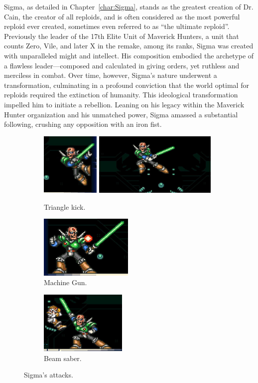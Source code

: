 Sigma, as detailed in Chapter~\ref{char:Sigma}, stands as the greatest creation of Dr. Cain, the creator of all reploids, and is often considered as the most powerful reploid ever created, sometimes even referred to as ``the ultimate reploid''. Previously the leader of the 17th Elite Unit of Maverick Hunters, a unit that counts Zero, Vile, and later X in the remake, among its ranks, Sigma was created with unparalleled might and intellect. His composition embodied the archetype of a flawless leader—composed and calculated in giving orders, yet ruthless and merciless in combat. Over time, however, Sigma's nature underwent a transformation, culminating in a profound conviction that the world optimal for reploids required the extinction of humanity. This ideological transformation impelled him to initiate a rebellion. Leaning on his legacy within the Maverick Hunter organization and his unmatched power, Sigma amassed a substantial following, crushing any opposition with an iron fist.
\begin{figure}[htp]
	\centering
	\begin{subfigure}{\linewidth}
		\centering
		\includegraphics[height=3cm]{figures/X1/Sigma_stages/Sigma_leap_3.jpg}
		\includegraphics[height=3cm]{figures/X1/Sigma_stages/Sigma_leap.jpg}
		\caption{Triangle kick.}
	\end{subfigure}
	\begin{subfigure}{0.4\linewidth}
		\centering
		\includegraphics[height=3cm]{figures/X1/Sigma_stages/Sigma_plasma.jpg}
		\caption{Machine Gun.}
	\end{subfigure}
	\begin{subfigure}{0.4\linewidth}
		\centering
		\includegraphics[height=3cm]{figures/X1/Sigma_stages/Sigma_sword.jpg}
		\caption{Beam saber.}
	\end{subfigure}
	\caption{Sigma's attacks.}
\end{figure}
